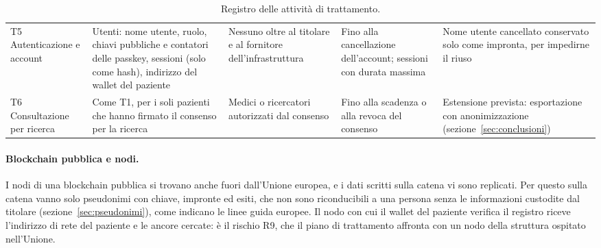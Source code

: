 \begin{table}[H]
\begin{tabular}{@{}p{} p{} p{} p{} p{}@{}}
T5 Autenticazione e account & Utenti: nome utente, ruolo, chiavi pubbliche e contatori delle passkey, sessioni (solo come hash), indirizzo del wallet del paziente & Nessuno oltre al titolare e al fornitore dell'infrastruttura & Fino alla cancellazione dell'account; sessioni con durata massima & Nome utente cancellato conservato solo come impronta, per impedirne il riuso\\
T6 Consultazione per ricerca & Come T1, per i soli pazienti che hanno firmato il consenso per la ricerca & Medici o ricercatori autorizzati dal consenso & Fino alla scadenza o alla revoca del consenso & Estensione prevista: esportazione con anonimizzazione (sezione~\ref{sec:conclusioni})\\
\bottomrule
\end{tabular}
\caption{Registro delle attività di trattamento.}\label{tab:registro}
\end{table}

\paragraph{Blockchain pubblica e nodi.} I nodi di una blockchain pubblica si trovano anche fuori dall'Unione europea, e i dati scritti sulla catena vi sono replicati. Per questo sulla catena vanno solo pseudonimi con chiave, impronte ed esiti, che non sono riconducibili a una persona senza le informazioni custodite dal titolare (sezione~\ref{sec:pseudonimi}), come indicano le linee guida europee\cite{edpb-blockchain}. Il nodo con cui il wallet del paziente verifica il registro riceve l'indirizzo di rete del paziente e le ancore cercate: è il rischio R9, che il piano di trattamento affronta con un nodo della struttura ospitato nell'Unione.

